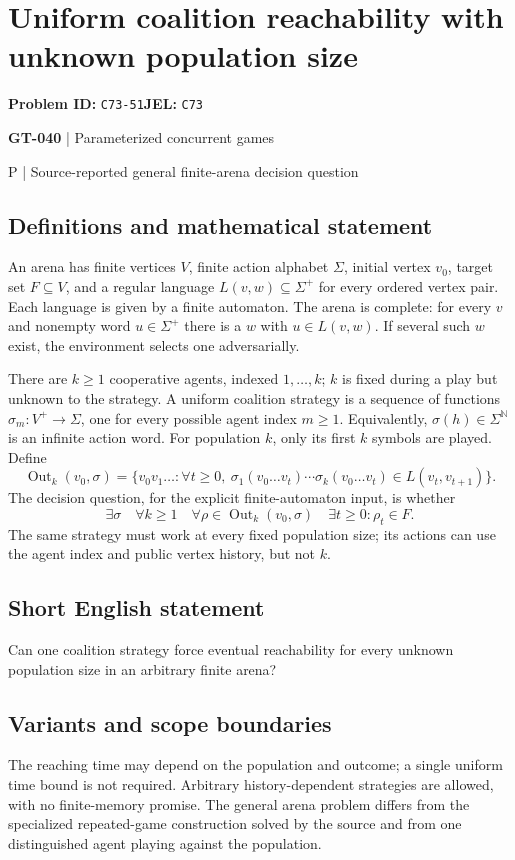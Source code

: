 \documentclass[11pt,a4paper]{article}
\begin{document}
\section*{Uniform coalition reachability with unknown population size}
\textbf{Problem ID:} \texttt{C73-51}\quad \textbf{JEL:} \texttt{C73}\par
\label{problem:OP-0170}
\label{game:GT-040}
{\sffamily\small\color{muted}
{\sffamily\small\color{muted}\textbf{GT-040} | Parameterized concurrent games\par P | Source-reported general finite-arena decision question\par}
\par}
\subsection*{Definitions and mathematical statement}
An arena has finite vertices $V$, finite action alphabet $\Sigma$, initial vertex $v_0$, target set $F\subseteq V$, and a regular language $L(v,w)\subseteq\Sigma^+$ for every ordered vertex pair. Each language is given by a finite automaton. The arena is complete: for every $v$ and nonempty word $u\in\Sigma^+$ there is a $w$ with $u\in L(v,w)$. If several such $w$ exist, the environment selects one adversarially.

There are $k\geq1$ cooperative agents, indexed $1,\ldots,k$; $k$ is fixed during a play but unknown to the strategy. A uniform coalition strategy is a sequence of functions $\sigma_m:V^+\to\Sigma$, one for every possible agent index $m\geq1$. Equivalently, $\sigma(h)\in\Sigma^{\mathbb N}$ is an infinite action word. For population $k$, only its first $k$ symbols are played. Define
\[
 \operatorname{Out}_k(v_0,\sigma)=
 \{v_0v_1\ldots:\forall t\geq0,\ 
 \sigma_1(v_0\ldots v_t)\cdots\sigma_k(v_0\ldots v_t)
 \in L(v_t,v_{t+1})\}.
\]
The decision question, for the explicit finite-automaton input, is whether
\[
 \exists\sigma\quad\forall k\geq1\quad
 \forall\rho\in\operatorname{Out}_k(v_0,\sigma)\quad
 \exists t\geq0:\rho_t\in F.
\]
The same strategy must work at every fixed population size; its actions can use the agent index and public vertex history, but not $k$.
\subsection*{Short English statement}
Can one coalition strategy force eventual reachability for every unknown population size in an arbitrary finite arena?
\subsection*{Variants and scope boundaries}
The reaching time may depend on the population and outcome; a single uniform time bound is not required. Arbitrary history-dependent strategies are allowed, with no finite-memory promise. The general arena problem differs from the specialized repeated-game construction solved by the source and from one distinguished agent playing against the population.
\end{document}
